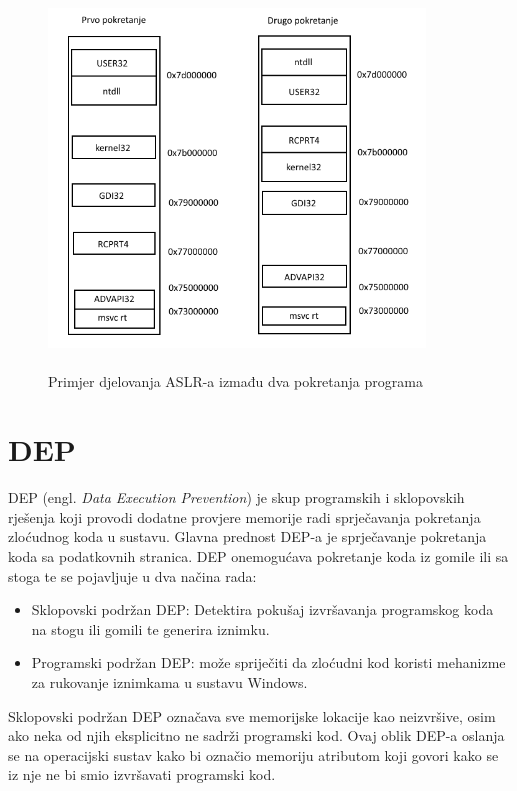 \documentclass[times, utf8, diplomski, numeric]{fer}
\begin{document}
\begin{figure}[!ht]
\centering
\setlength\fboxsep{0pt}
\setlength\fboxrule{0.5pt}
\includegraphics[width=10cm, height=10cm]{slike/aslr_v2}
\caption{Primjer djelovanja ASLR-a izmađu dva pokretanja programa}
\label{fig:aslr} 
\end{figure} 

\section{DEP}
\label{sct:dep}

DEP (engl. \emph{Data Execution Prevention}) je skup programskih i
sklopovskih rješenja koji provodi dodatne provjere memorije radi
sprječavanja pokretanja zloćudnog koda u sustavu. Glavna prednost
DEP-a je sprječavanje pokretanja koda sa podatkovnih stranica.
DEP onemogućava pokretanje koda iz gomile ili sa stoga te se
pojavljuje u dva načina rada:

\begin{itemize}
\item Sklopovski podržan DEP: Detektira pokušaj izvršavanja programskog koda
 na stogu ili gomili te generira iznimku.
\item Programski podržan DEP: može spriječiti da zloćudni kod koristi mehanizme za rukovanje iznimkama u sustavu Windows.
\end{itemize}

Sklopovski podržan DEP označava sve memorijske lokacije kao neizvršive, 
osim ako neka od njih eksplicitno ne sadrži programski
kod. Ovaj oblik DEP-a oslanja se na operacijski sustav kako bi označio
memoriju atributom koji govori kako se iz nje ne bi smio
izvršavati programski kod.
\end{document}
